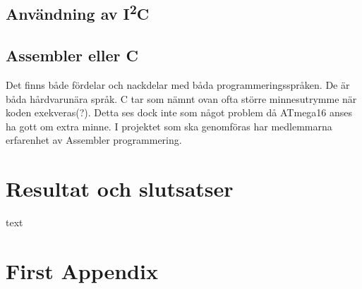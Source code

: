 \documentclass[11pt]{article}
\begin{document}
\begin{flushleft}
\subsection{Användning av I\textsuperscript{2}C}

\subsection {Assembler eller C}

Det finns både fördelar och nackdelar med båda programmeringsspråken. De är båda hårdvarunära språk. C tar som nämnt ovan ofta större minnesutrymme när koden exekveras(?). Detta ses dock inte som något problem då ATmega16 anses ha gott om extra minne.
I projektet som ska genomföras har medlemmarna erfarenhet av Assembler programmering. 
\pagebreak

\section{Resultat och slutsatser}
text

\pagebreak
{}



\pagebreak
\appendix
\section{First Appendix}

\end{flushleft}
\end{document}
